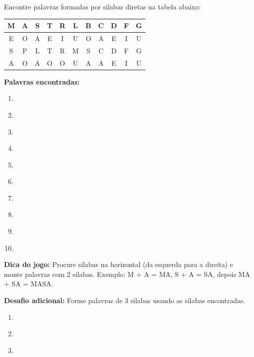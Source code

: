 \begin{exercicio}
Encontre palavras formadas por silabas diretas na tabela abaixo:

\begin{center}
\begin{tabular}{|c|c|c|c|c|c|c|c|c|c|c|}
\hline
M & A & S & T & R & L & B & C & D & F & G \\
\hline
E & O & A & E & I & U & O & A & E & I & U \\
\hline
S & P & L & T & R & M & S & C & D & F & G \\
\hline
A & O & A & O & O & U & A & A & E & I & U \\
\hline
\end{tabular}
\end{center}

\textbf{Palavras encontradas:}
\begin{enumerate}
  \item \underline{\hspace{4cm}}
  \item \underline{\hspace{4cm}}
  \item \underline{\hspace{4cm}}
  \item \underline{\hspace{4cm}}
  \item \underline{\hspace{4cm}}
  \item \underline{\hspace{4cm}}
  \item \underline{\hspace{4cm}}
  \item \underline{\hspace{4cm}}
  \item \underline{\hspace{4cm}}
  \item \underline{\hspace{4cm}}
\end{enumerate}

\textbf{Dica do jogo:} Procure silabas na horizontal (da esquerda para a direita) e monte palavras com 2 silabas. Exemplo: M + A = MA, S + A = SA, depois MA + SA = MASA.

\vspace{1em}

\textbf{Desafio adicional:} Forme palavras de 3 silabas usando as silabas encontradas.
\begin{enumerate}[resume]
  \item \underline{\hspace{4cm}}
  \item \underline{\hspace{4cm}}
  \item \underline{\hspace{4cm}}
\end{enumerate}
\end{exercicio}

